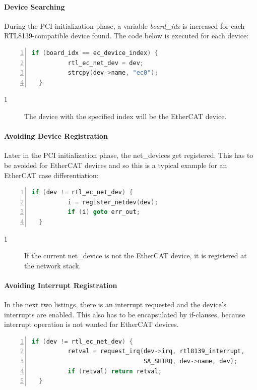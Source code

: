 \documentclass[a4paper,12pt,BCOR6mm,bibtotoc,idxtotoc]{scrbook}
\newcommand{\linenum}[1]{\normalfont\textcircled{\tiny #1}}
\begin{document}
\paragraph{Device Searching}

During the PCI initialization phase, a variable \textit{board\_idx} is
increased for each RTL8139-compatible device found. The code below is
executed for each device:

\begin{lstlisting}[gobble=2,language=C,numbers=left]
  if (board_idx == ec_device_index) {
          rtl_ec_net_dev = dev;
          strcpy(dev->name, "ec0");
  }
\end{lstlisting}

\begin{description}
\item[\linenum{1}] The device with the specified
  index will be the EtherCAT device.
\end{description}

\paragraph{Avoiding Device Registration}

Later in the PCI initialization phase, the net\_devices get
registered. This has to be avoided for EtherCAT devices and so this is
a typical example for an EtherCAT case differentiation:

\begin{lstlisting}[gobble=2,language=C,numbers=left]
  if (dev != rtl_ec_net_dev) {
          i = register_netdev(dev);
          if (i) goto err_out;
  }
\end{lstlisting}

\begin{description}
\item[\linenum{1}] If the current net\_device is
  not the EtherCAT device, it is registered at the network stack.
\end{description}

\paragraph{Avoiding Interrupt Registration}

In the next two listings, there is an interrupt requested and the
device's interrupts are enabled. This also has to be encapsulated by
if-clauses, because interrupt operation is not wanted for EtherCAT
devices.

\begin{lstlisting}[gobble=2,language=C,numbers=left]
  if (dev != rtl_ec_net_dev) {
          retval = request_irq(dev->irq, rtl8139_interrupt,
                               SA_SHIRQ, dev->name, dev);
          if (retval) return retval;
  }
\end{lstlisting}
\end{document}
